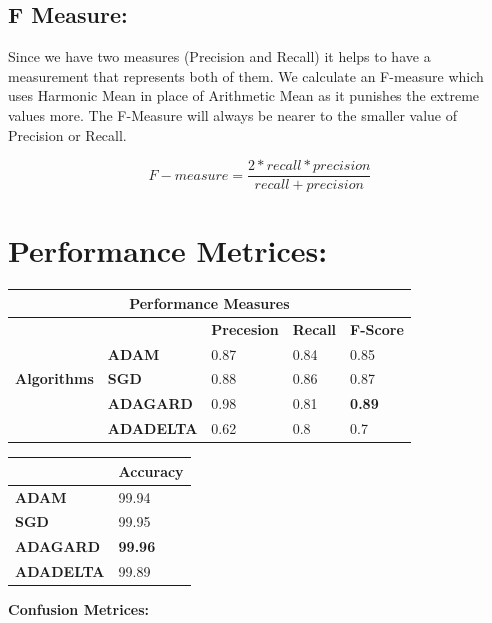 \documentclass{report}
\begin{document}
\subsection{F Measure: }
Since we have two measures (Precision and Recall) it helps to have a measurement that represents both of them. We calculate an F-measure which uses Harmonic Mean in place of Arithmetic Mean as it punishes the extreme values more.
The F-Measure will always be nearer to the smaller value of Precision or Recall.

\[F-measure = \frac{2 * recall * precision}{recall + precision}\]



\section{Performance Metrices: }
\begin{table}[htbp]
\begin{tabular}{|l|l|l|l|l|}
\hline
\multicolumn{5}{|c|}{\textbf{Performance Measures}} \\ \hline
\multirow{5}{*}{\textbf{Algorithms}} & \textbf{} & \textbf{Precesion} & \textbf{Recall} & \textbf{F-Score} \\ \cline{2-5} 
 & \textbf{ADAM} & 0.87 & 0.84 & 0.85 \\ \cline{2-5} 
 & \textbf{SGD} & 0.88 & 0.86 & 0.87 \\ \cline{2-5} 
 & \textbf{ADAGARD} & 0.98 & 0.81 & \textbf{0.89} \\ \cline{2-5} 
 & \textbf{ADADELTA} & 0.62 & 0.8 & 0.7 \\ \hline
\end{tabular}
\end{table}


\begin{table}[htbp]
\begin{tabular}{|l|l|}
\hline
 & \textbf{Accuracy} \\ \hline
\textbf{ADAM} & 99.94 \\ \hline
\textbf{SGD} & 99.95 \\ \hline
\textbf{ADAGARD} & \textbf{99.96} \\ \hline
\textbf{ADADELTA} & 99.89 \\ \hline
\end{tabular}
\end{table}

\textbf{Confusion Metrices: }
\end{document}
